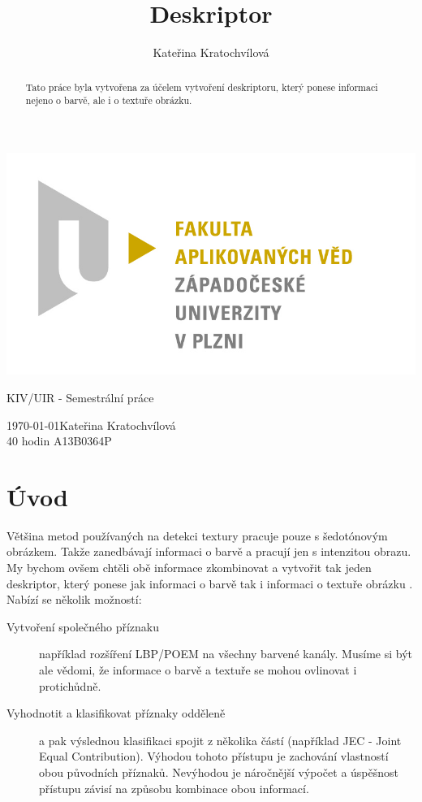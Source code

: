 \documentclass{report}
\title{Deskriptor}
\author{Kateřina Kratochvílová}
\begin{document}
 
\shorthandoff{-}
\begin{titlepage}
	\begin{flushleft} 
		{\includegraphics[width=.5\textwidth]{./img/fav_logo.jpg}\\[3cm]}
	\end{flushleft}
	\vspace{1.5cm}
	\begin{center}
		{\Huge KIV/UIR - Semestrální práce}
	\end{center}
	\vfill
	{\normalsize 
		\today \hfill Kateřina Kratochvílová \\
		40 hodin \hfill A13B0364P \\
	}

\end{titlepage}


\tableofcontents
\thispagestyle{empty} %

\begin{abstract}
Tato práce byla vytvořena za účelem vytvoření deskriptoru, který ponese informaci nejeno o barvě, ale i o textuře obrázku. 
\end{abstract}

\chapter{Úvod}
Většina metod používaných na detekci textury pracuje pouze s šedotónovým obrázkem. Takže zanedbávají informaci o barvě a pracují jen s intenzitou obrazu. My bychom ovšem chtěli obě informace zkombinovat a vytvořit tak jeden deskriptor, který ponese jak informaci o barvě tak i informaci o textuře obrázku \cite{DiplomovaBrno}. Nabízí se několik možností: 

\begin{description}
\item[Vytvoření společného příznaku] 
	například rozšíření LBP/POEM na všechny barvené kanály. Musíme si být ale vědomi, že informace o barvě a textuře se mohou ovlinovat i protichůdně. 

\item[Vyhodnotit a klasifikovat příznaky odděleně] 
	a pak výslednou klasifikaci spojit z několika částí (například JEC - Joint Equal Contribution). Výhodou tohoto přístupu je zachování vlastností obou původních příznaků. Nevýhodou je náročnější výpočet a úspěšnost přístupu závisí na způsobu kombinace obou informací.
\end{description} 
\end{document}

